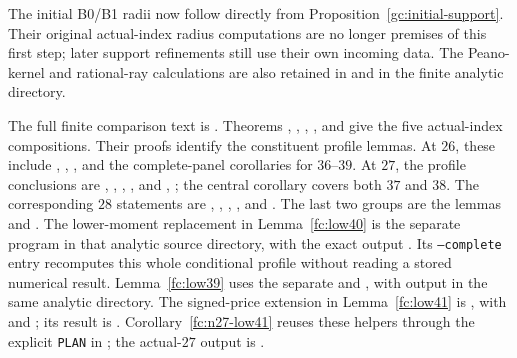 The initial B0/B1 radii now follow directly from
Proposition~\ref{gc:initial-support}. Their original actual-index
radius computations are no longer premises of this first step;
later support refinements still use their own incoming data.
The Peano-kernel and rational-ray calculations are also retained in
 and
 in the finite analytic directory.

The full finite comparison text is
.
Theorems , ,
, , and
 give the five actual-index compositions.
Their proofs identify the constituent profile lemmas.
At $26$, these include ,
,
, and the complete-panel
corollaries for $36$--$39$.
At $27$, the profile conclusions are
, ,
, , and
, ;
the central corollary covers both $37$ and $38$.
The corresponding $28$ statements are
, ,
, , and
.
The last two groups are the lemmas
 and
.
The lower-moment replacement in Lemma~\ref{fc:low40} is the
separate program 
in that analytic source directory, with the exact output
.
Its \texttt{--complete} entry recomputes this whole conditional
profile without reading a stored numerical result.
Lemma~\ref{fc:low39} uses the separate
 and
, with output
 in the
same analytic directory.
The signed-price extension in Lemma~\ref{fc:low41} is
, with
 and
; its result is
.
Corollary~\ref{fc:n27-low41} reuses these helpers through the
explicit \texttt{PLAN} in
; the actual-$27$ output is
.
